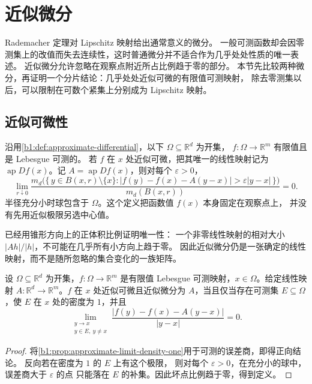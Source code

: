 \section{近似微分}
\label{b1:sec:1603}

Rademacher 定理对 Lipschitz 映射给出通常意义的微分。
一般可测函数却会因零测集上的改值而失去连续性，这时普通微分并不适合作为几乎处处性质的唯一表述。
近似微分允许忽略在观察点附近所占比例趋于零的部分。
本节先比较两种微分，再证明一个分片结论：几乎处处近似可微的有限值可测映射，
除去零测集以后，可以限制在可数个紧集上分别成为 Lipschitz 映射。


\subsection{近似可微性}
\label{b1:subsec:160301}

沿用\cref{b1:def:approximate-differential}，以下 \(\Omega\subseteq\mathbb R^d\) 为开集，
\(f:\Omega\rightarrow\mathbb R^m\) 有限值且是 Lebesgue 可测的。
若 \(f\) 在 \(x\) 处近似可微，把其唯一的线性映射记为
\(\operatorname{ap}Df(x)\)。记 \(A=\operatorname{ap}Df(x)\)，则对每个 \(\varepsilon>0\)，
\begin{equation}\label{b1:eq:approximate-differential-bad-set}
 \lim_{r\downarrow0}\frac{
 m_d\bigl(\{\,y\in B(x,r)\setminus\{x\}:
 |f(y)-f(x)-A(y-x)|>\varepsilon|y-x|\,\}\bigr)}
 {m_d(B(x,r))}=0.
\end{equation}
半径充分小时球包含于 \(\Omega\)。这个定义把函数值 \(f(x)\) 本身固定在观察点上，
并没有先用近似极限另选中心值。

\ProseParagraphBreak

已经用锥形方向上的正体积比例证明唯一性：
一个非零线性映射的相对大小 \(|Ah|/|h|\)，不可能在几乎所有小方向上趋于零。
因此近似微分仍是一张确定的线性映射，而不是随所忽略的集合变化的一族矩阵。

\begin{proposition}\label{b1:prop:approximate-differential-density-set}
设 \(\Omega\subseteq\mathbb R^d\) 为开集，\(f:\Omega\to\mathbb R^m\) 是有限值 Lebesgue 可测映射，\(x\in\Omega\)。给定线性映射 \(A:\mathbb R^d\to\mathbb R^m\)。\(f\) 在 \(x\) 处近似可微且近似微分为 \(A\)，当且仅当存在可测集
\(E\subseteq\Omega\)，使 \(E\) 在 \(x\) 处的密度为 \(1\)，并且
\[
 \lim_{\substack{y\to x\\y\in E,\ y\ne x}}
 \frac{|f(y)-f(x)-A(y-x)|}{|y-x|}=0.
\]
\end{proposition}
\begin{proof}
将\cref{b1:prop:approximate-limit-density-one}用于可测的误差商，即得正向结论。
反向若在密度为 \(1\) 的 \(E\) 上有这个极限，
则对每个 \(\varepsilon>0\)，在充分小的球中，误差商大于 \(\varepsilon\) 的点
只能落在 \(E\) 的补集。因此坏点比例趋于零，得到定义。
\end{proof}

